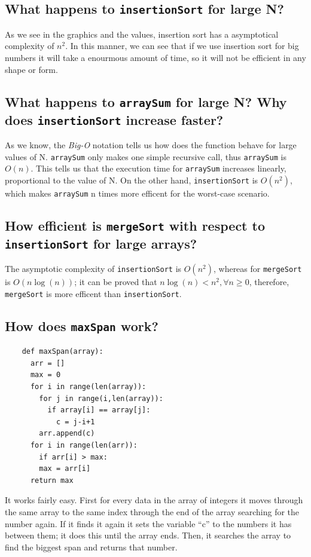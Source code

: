 \documentclass[a4paper,12pt]{article}
\begin{document}
    \subsection{What happens to \texttt{insertionSort} for large N?}
      As we see in the graphics and the values, insertion sort has a asymptotical
      complexity of $n^2$. In this manner, we can see that if we use insertion sort for
      big numbers it will take a enourmous amount of time, so it will not be
      efficient in any shape or form.

  \subsection{What happens to \texttt{arraySum} for large N? Why does \texttt{insertionSort} increase faster?}
    As we know, the \textit{Big-O} notation tells us how does the function behave for large values of N.
    \texttt{arraySum} only makes one simple recursive call, thus \texttt{arraySum} is $O(n)$. This tells us
    that the execution time for \texttt{arraySum} increases linearly, proportional to the value of N. On the other hand,
    \texttt{insertionSort} is $O(n^2)$, which makes \texttt{arraySum} n times more efficent for the worst-case scenario.

  \subsection{How efficient is \texttt{mergeSort} with respect to \texttt{insertionSort} for large arrays?}
    The asymptotic complexity of \texttt{insertionSort} is $O(n^2)$, whereas for \texttt{mergeSort} is $O(n\log(n))$; it can be proved
    that $n\log(n)<n^2, \forall n\geq0$, therefore, \texttt{mergeSort} is more efficent than \texttt{insertionSort}.

  \subsection{How does \texttt{maxSpan} work?}
  \begin{Verbatim}
    def maxSpan(array):
      arr = []
      max = 0
      for i in range(len(array)):
        for j in range(i,len(array)):
          if array[i] == array[j]:
            c = j-i+1
        arr.append(c)
      for i in range(len(arr)):
        if arr[i] > max:
        max = arr[i]
      return max
  \end{Verbatim}
It works fairly easy. First for every data in the array of integers it moves
through the same array to the same index through the end of the array
searching for the number again. If it finds it again it sets the variable ``c''
to the numbers it has between them; it does this until the array ends. Then,
it searches the array to find the biggest span and returns that number.
\end{document}
